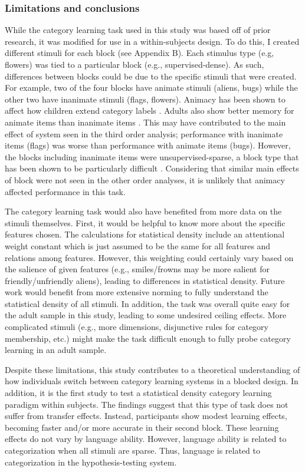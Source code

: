 \documentclass[../dissertation.tex]{subfiles}
\begin{document}
\subsubsection{Limitations and conclusions}

	While the category learning task used in this study was based off of prior research, it was modified for use in a within-subjects design. To do this, I created different stimuli for each block (see Appendix B). Each stimulus type (e.g, flowers) was tied to a particular block (e.g., supervised-dense). As such, differences between blocks could be due to the specific stimuli that were created. For example, two of the four blocks have animate stimuli (aliens, bugs) while the other two have inanimate stimuli (flags, flowers). Animacy has been shown to affect how children extend category labels \citep{Davidson2018}. Adults also show better memory for animate items than inanimate items \citep{Bonin2014}. This may have contributed to the main effect of system seen in the third order analysis; performance with inanimate items (flags) was worse than performance with animate items (bugs). However, the blocks including inanimate items were unsupervised-sparse, a block type that has been shown to be particularly difficult \citep{Kloos2008}. Considering that similar main effects of block were not seen in the other order analyses, it is unlikely that animacy affected performance in this task. \par 
	The category learning task would also have benefited from more data on the stimuli themselves. First, it would be helpful to know more about the specific features chosen. The calculations for statistical density include an attentional weight constant which is just assumed to be the same for all features and relations among features. However, this weighting could certainly vary based on the salience of given features (e.g., smiles/frowns may be more salient for friendly/unfriendly aliens), leading to differences in statistical density. Future work would benefit from more extensive norming to fully understand the statistical density of all stimuli. In addition, the task was overall quite easy for the adult sample in this study, leading to some undesired ceiling effects. More complicated stimuli (e.g., more dimensions, disjunctive rules for category membership, etc.) might make the task difficult enough to fully probe category learning in an adult sample. \par
	Despite these limitations, this study contributes to a theoretical understanding of how individuals switch between category learning systems in a blocked design. In addition, it is the first study to test a statistical density category learning paradigm within subjects. The findings suggest that this type of task does not suffer from transfer effects. Instead, participants show modest learning effects, becoming faster and/or more accurate in their second block. These learning effects do not vary by language ability. However, language ability is related to categorization when all stimuli are sparse. Thus, language is related to categorization in the hypothesis-testing system.
	
\end{document}
